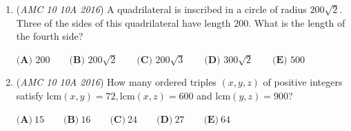 \begin{enumerate}
	\item (\textit{AMC 10 10A 2016}) A quadrilateral is inscribed in a circle of radius $200\sqrt{2}$. Three of the sides of this quadrilateral have length $200$. What is the length of the fourth side?


 $\textbf{(A) }200\qquad \textbf{(B) }200\sqrt{2}\qquad\textbf{(C) }200\sqrt{3}\qquad\textbf{(D) }300\sqrt{2}\qquad\textbf{(E) } 500$


	\item (\textit{AMC 10 10A 2016}) How many ordered triples $(x,y,z)$ of positive integers satisfy $\text{lcm}(x,y) = 72, \text{lcm}(x,z) = 600$ and $\text{lcm}(y,z)=900$?


 $\textbf{(A)}\ 15\qquad\textbf{(B)}\ 16\qquad\textbf{(C)}\ 24\qquad\textbf{(D)}\ 27\qquad\textbf{(E)}\ 64$


\end{enumerate}